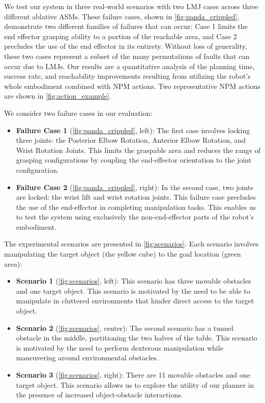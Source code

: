 We test our system in three real-world scenarios with two LMJ cases across three different ablative ASMs. These failure cases, shown in \cref{fig:panda_crippled}, demonstrate two different families of failures that can occur: Case 1 limits the end effector grasping ability to a portion of the reachable area, and Case 2 precludes the use of the end effector in its entirety. Without loss of generality, these two cases represent a subset of the many permutations of faults that can occur due to LMJs. Our results are a quantitative analysis of the planning time, success rate, and reachability improvements resulting from utilizing the robot's whole embodiment combined with NPM actions. Two representative NPM actions are shown in \cref{fig:action_example}.

We consider two failure cases in our evaluation: 
\begin{itemize}
    \item \textbf{Failure Case 1} (\cref{fig:panda_crippled}, left): The first case involves locking three joints: the Posterior Elbow Rotation, Anterior Elbow Rotation, and Wrist Rotation Joints.
    This limits the graspable area and reduces the range of grasping configurations by coupling the end-effector orientation to the joint configuration.
    \item \textbf{Failure Case 2} (\cref{fig:panda_crippled}, right): In the second case, two joints are locked: the wrist lift and wrist rotation joints. This failure case precludes the use of the end-effector in completing manipulation tasks. This enables us to test the system using exclusively the non-end-effector parts of the robot's embodiment. 
\end{itemize}
The experimental scenarios are presented in \cref{fig:scenarios}. Each scenario involves manipulating the target object (the yellow cube) to the goal location (green area):
\begin{itemize}
    \item \textbf{Scenario 1} (\cref{fig:scenarios}, left): This scenario has three movable obstacles and one target object. This scenario is motivated by the need to be able to manipulate in cluttered environments that hinder direct access to the target object. 
     \item \textbf{Scenario 2} (\cref{fig:scenarios}, center): The second scenario has a tunnel obstacle in the middle, partitioning the two halves of the table. This scenario is motivated by the need to perform dexterous manipulation while maneuvering around environmental obstacles.
    \item \textbf{Scenario 3} (\cref{fig:scenarios}, right): There are 11 movable obstacles and one target object. This scenario allows us to explore the utility of our planner in the presence of increased object-obstacle interactions.
\end{itemize}

